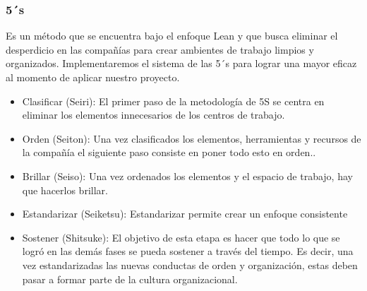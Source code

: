     \subsubsection{5´s}
    Es un método que se encuentra  bajo el enfoque Lean y que busca eliminar el desperdicio en las compañías para crear ambientes de trabajo limpios y organizados.
    Implementaremos el sistema de las 5´s para lograr una mayor eficaz al momento de aplicar nuestro proyecto.\cite{MF}
    \begin{itemize}
        \item Clasificar (Seiri):
    El primer paso de la metodología de 5S se centra en eliminar los elementos innecesarios de los centros de trabajo.\\ 
        \item Orden (Seiton):
    Una vez clasificados los elementos, herramientas y recursos de la compañía el siguiente paso consiste en poner todo esto en orden..\\
         \item  Brillar (Seiso):
    Una vez ordenados los elementos y el espacio de trabajo, hay que hacerlos brillar.\\ 
    
        \item Estandarizar (Seiketsu): Estandarizar permite crear un enfoque consistente\\
    
        \item Sostener (Shitsuke): 
    El objetivo de esta etapa es hacer que todo lo que se logró en las demás fases se pueda sostener a través del tiempo. Es decir, una vez estandarizadas las nuevas conductas de orden y organización, estas deben pasar a formar parte de la cultura organizacional.   
    \end{itemize}
